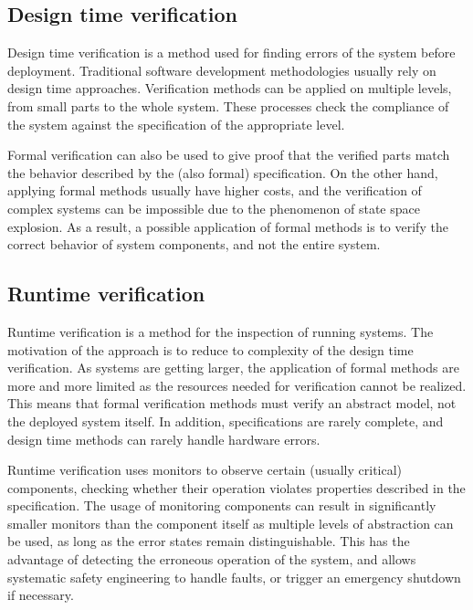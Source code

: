 \subsection{Design time verification}

Design time verification is a method used for finding errors of the system before deployment. Traditional software development methodologies usually rely on design time approaches. Verification methods can be applied on multiple levels, from small parts to the whole system. These processes check the compliance of the system against the specification of the appropriate level.%

Formal verification can also be used to give proof that the verified parts match the behavior described by the (also formal) specification. On the other hand, applying formal methods usually have higher costs, and the verification of complex systems can be impossible due to the phenomenon of state space explosion. As a result, a possible application of formal methods is to verify the correct behavior of system components, and not the entire system.

\subsection{Runtime verification}

Runtime verification is a method for the inspection of running systems. The motivation of the approach
is to reduce to complexity of the design time verification. 
As systems are getting larger, the application of formal methods are more and more limited as the resources needed for verification cannot be realized. This means that formal verification methods must verify an abstract model, not the deployed system itself. In addition, specifications are rarely complete, and design time methods can rarely handle hardware errors. %

Runtime verification uses monitors to observe certain (usually critical) components, checking whether their operation violates properties described in the specification. The usage of monitoring components can result in significantly smaller monitors than the component itself as multiple levels of abstraction can be used, as long as the error states remain distinguishable. This has the advantage of detecting the erroneous operation of the system, and allows systematic safety engineering to handle faults, or trigger an emergency shutdown if necessary.

